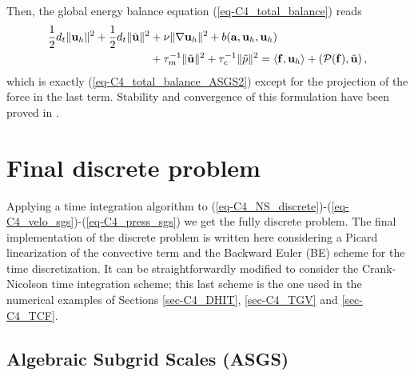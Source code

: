 Then, the global energy balance equation (\ref{eq-C4_total_balance}) reads
\begin{align}
\label{eq-C4_total_balance_OSS2}
\frac{1}{2}d_t\|\u_h\|^2+\frac{1}{2}d_t\|\tilde{\u}\|^2
&+\nu\|\nabla\u_h\|^2+b(\a,\u_h,\u_h) \\ \nonumber
&+\tau_m^{-1}\|\tilde{\u}\|^2+\tau_c^{-1}\|\tilde{p}\|^2 %
=\left<\mathbf{f},\mathbf{u}_h\right>+\left(\mathcal{P}(\mathbf{f}),\tilde{\u}\right),
\end{align}
which is exactly (\ref{eq-C4_total_balance_ASGS2}) except for the projection of the force in the last term. Stability and convergence of this formulation have been proved in \cite{Badia2010,Badia2013Convergence}.

\section{Final discrete problem}
\label{sec-C4_discrete}
Applying a time integration algorithm to (\ref{eq-C4_NS_discrete})-(\ref{eq-C4_velo_sgs})-(\ref{eq-C4_press_sgs}) we get the fully discrete problem. The final implementation of the discrete problem is written here considering a Picard linearization of the convective term and the Backward Euler (BE) scheme for the time discretization. It can be straightforwardly modified to consider the Crank-Nicolson time integration scheme; this last scheme is the one used in the numerical examples of Sections \ref{sec-C4_DHIT},  \ref{sec-C4_TGV} and \ref{sec-C4_TCF}.

\subsection{Algebraic Subgrid Scales (ASGS)}

